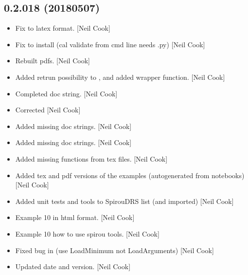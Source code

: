 \documentclass[a4paper,10pt,english]{report}
\begin{document}
\subsection{0.2.018 (2018\sphinxhyphen{}05\sphinxhyphen{}07)}
\label{\detokenize{misc/changelog:id461}}\begin{itemize}
\item {} 
Fix to latex format. {[}Neil Cook{]}

\item {} 
Fix to install (cal validate from cmd line needs .py) {[}Neil Cook{]}

\item {} 
Rebuilt pdfs. {[}Neil Cook{]}

\item {} 
Added retrun possibility to , and added
 wrapper function. {[}Neil Cook{]}

\item {} 
Completed doc string. {[}Neil Cook{]}

\item {} 
Corrected  {[}Neil Cook{]}

\item {} 
Added missing doc strings. {[}Neil Cook{]}

\item {} 
Added missing doc strings. {[}Neil Cook{]}

\item {} 
Added missing functions from tex files. {[}Neil Cook{]}

\item {} 
Added tex and pdf versions of the examples (auto\sphinxhyphen{}generated from
notebooks) {[}Neil Cook{]}

\item {} 
Added unit tests and tools to SpirouDRS  list (and imported)
{[}Neil Cook{]}

\item {} 
Example 10 in html format. {[}Neil Cook{]}

\item {} 
Example 10 \sphinxhyphen{} how to use spirou tools. {[}Neil Cook{]}

\item {} 
Fixed bug in  (use LoadMinimum not LoadArguments) {[}Neil
Cook{]}

\item {} 
Updated date and version. {[}Neil Cook{]}


\end{itemize}
\end{document}

